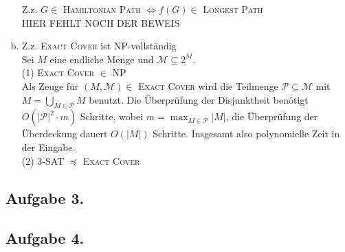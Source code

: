 \documentclass[11pt,a4paper,ngerman]{article}
\begin{document}
\begin{enumerate}[a)]
Z.z. $G \in $ \textsc{Hamiltonian Path} $\Leftrightarrow f(G) \in $ \textsc{Longest Path}\\
HIER FEHLT NOCH DER BEWEIS
\item Z.z. \textsc{Exact Cover} ist NP-vollständig \\
Sei $M$ eine endliche Menge und $\mathcal{M} \subseteq 2^M$.\\
(1) \textsc{Exact Cover} $\in$ NP \\
Als Zeuge für $(M,\mathcal{M}) \in$ \textsc{Exact Cover} wird die Teilmenge $\mathcal{P} \subseteq \mathcal{M}$ mit $M = \dot\bigcup_{M \in \mathcal{P}} M$ benutzt. Die Überprüfung der Disjunktheit benötigt $O(|\mathcal{P}|^2 \cdot m)$ Schritte, wobei $m = \max_{M \in \mathcal{P}} |M|$, die Überprüfung der Überdeckung dauert $O(|M|)$ Schritte. Insgesamt also polynomielle Zeit in der Eingabe.\\
(2) \textsc{3-SAT} $\preceq$ \textsc{Exact Cover} \\
\end{enumerate}
\subsection*{Aufgabe 3.}

\subsection*{Aufgabe 4.}


\label{LastPage}
\end{document}
